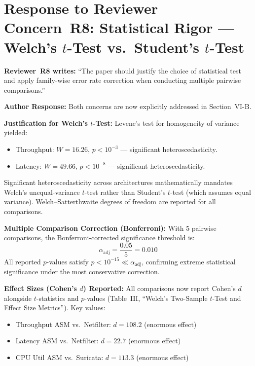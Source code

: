 \documentclass[10pt,letterpaper]{article}
\begin{document}
\section{Response to Reviewer Concern~R8: Statistical Rigor ---
Welch's $t$-Test vs.\ Student's $t$-Test}

\begin{reviewerbox}
\textbf{Reviewer~R8 writes:} ``The paper should justify the choice of
statistical test and apply family-wise error rate correction when conducting
multiple pairwise comparisons.''
\end{reviewerbox}

\begin{authorbox}
\textbf{Author Response:}
Both concerns are now explicitly addressed in Section~VI-B.

\textbf{Justification for Welch's $t$-Test:}
Levene's test for homogeneity of variance yielded:
\begin{itemize}
  \item Throughput: $W = 16.26$, $p < 10^{-3}$ --- significant heteroscedasticity.
  \item Latency: $W = 49.66$, $p < 10^{-8}$ --- significant heteroscedasticity.
\end{itemize}
Significant heteroscedasticity across architectures mathematically mandates
Welch's unequal-variance $t$-test rather than Student's $t$-test (which
assumes equal variance). Welch--Satterthwaite degrees of freedom are reported
for all comparisons.

\textbf{Multiple Comparison Correction (Bonferroni):}
With 5 pairwise comparisons, the Bonferroni-corrected significance threshold is:
\[
  \alpha_{\mathrm{adj}} = \frac{0.05}{5} = 0.010
\]
All reported $p$-values satisfy $p < 10^{-15} \ll \alpha_{\mathrm{adj}}$,
confirming extreme statistical significance under the most conservative
correction.

\textbf{Effect Sizes (Cohen's $d$) Reported:}
All comparisons now report Cohen's $d$ alongside $t$-statistics and
$p$-values (Table~III, ``Welch's Two-Sample $t$-Test and Effect Size
Metrics''). Key values:
\begin{itemize}
  \item Throughput ASM vs.\ Netfilter: $d = 108.2$ (enormous effect)
  \item Latency ASM vs.\ Netfilter: $d = 22.7$ (enormous effect)
  \item CPU Util ASM vs.\ Suricata: $d = 113.3$ (enormous effect)
\end{itemize}
\end{authorbox}
\end{document}
